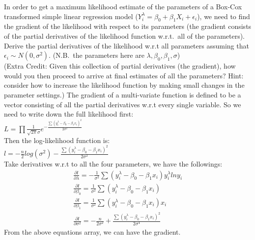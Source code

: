 \documentclass[12pt]{article}
\begin{document}
 { In order to get a maximum likelihood estimate of the
parameters of a Box-Cox transformed simple linear regression model
($Y_i^\lambda=\beta_0+\beta_1X_i+\epsilon_i$), we need to find the
gradient of the likelihood with respect to its parameters (the
gradient consists of the partial derivatives of the likelihood
function w.r.t.~all of the parameters). Derive the partial
derivatives of the likelihood w.r.t all parameters assuming that
$\epsilon_i\sim N(0,\sigma^2)$. (N.B.~the parameters here are
$\lambda,\beta_0,\beta_1,\sigma$)\\
(Extra Credit: Given this collection of partial derivatives (the
gradient), how would you then proceed to arrive at final estimates
of all the parameters?  Hint: consider how to increase the
likelihood function by making small changes in the parameter
settings.)
 }
 { \vfill
  \answer
} { The gradient of a multi-variate function is defined to be a
vector consisting of all the partial derivatives w.r.t every single
variable. So we need to write down the full likelihood first:\\
$L=\prod\frac{1}{\sqrt{2\pi}\sigma}e^{-\frac{\sum(y_i^\lambda-\beta_0-\beta_1 x_i)^2}{2\sigma^2}}$\\
Then the log-likelihood function is: \\
$l=-\frac{n}{2}log(\sigma^2)-\frac{\sum(y_i^\lambda-\beta_0-\beta_1 x_i)^2}{2\sigma^2}$\\
Take derivatives w.r.t to all the four parameters, we have the followings:\\
\begin{eqnarray}
\frac{\partial l}{\partial \lambda}=-\frac{1}{\sigma^2}\sum(y_i^\lambda-\beta_0-\beta_1 x_i)y_i^\lambda ln y_i\\
\frac{\partial l}{\partial \beta_0}=\frac{1}{\sigma^2}\sum(y_i^\lambda-\beta_0-\beta_1 x_i)\\
\frac{\partial l}{\partial \beta_1}=\frac{1}{\sigma^2}\sum(y_i^\lambda-\beta_0-\beta_1 x_i)x_i\\
\frac{\partial l}{\partial \sigma^2}=-\frac{n}{2\sigma^2}+\frac{\sum(y_i^\lambda-\beta_0-\beta_1 x_i)^2}{2\sigma^4}
\end{eqnarray}
From the above equations array, we can have the gradient.\\
}
\end{document}
